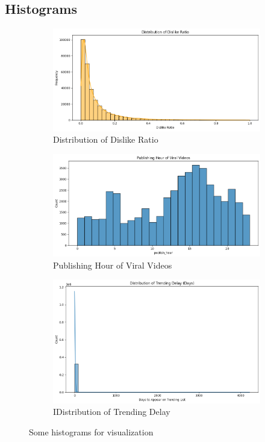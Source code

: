 \documentclass[a4paper]{article}
\begin{document}
\subsection{Histograms}
\begin{figure}[h]
    \centering
    \begin{subfigure}{0.3\textwidth}
        \includegraphics[width=\linewidth]{hist1.png}
        \caption{Distribution of Dislike Ratio}
        \label{fig:sub1}
    \end{subfigure}
    \hfill
    \begin{subfigure}{0.3\textwidth}
        \includegraphics[width=\linewidth]{hist2.png}
        \caption{Publishing Hour of Viral Videos}
        \label{fig:sub2}
    \end{subfigure}
    \hfill
    \begin{subfigure}{0.3\textwidth}
        \includegraphics[width=\linewidth]{hist3.png}
        \caption{IDistribution of Trending Delay}
        \label{fig:sub3}
    \end{subfigure}
    \caption{Some histograms for visualization}
    \label{fig:multi}
\end{figure}
\end{document}

